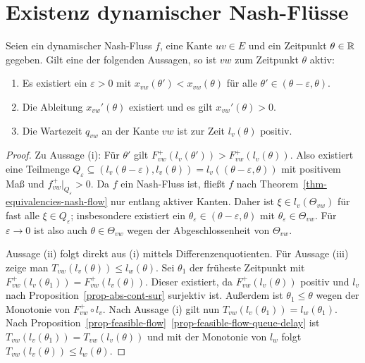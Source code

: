 \section{Existenz dynamischer Nash-Flüsse}

\begin{lemma}\label{lemma-nash-flow-waiting-queue-implies-active-edge}
	Seien ein dynamischer Nash-Fluss $f$, eine Kante $uv\in E$ und ein Zeitpunkt $\theta\in\mathbb{R}$ gegeben.
	Gilt eine der folgenden Aussagen, so ist $vw$ zum Zeitpunkt $\theta$ aktiv:
	\begin{enumerate}[label=(\roman*)]
		\item Es existiert ein $\varepsilon>0$ mit $x_{vw}(\theta')<x_{vw}(\theta)$ für alle $\theta'\in(\theta-\varepsilon, \theta)$.
		\item Die Ableitung $x_{vw}'(\theta)$ existiert und es gilt $x_{vw}'(\theta)> 0$.
		\item Die Wartezeit $q_{vw}$ an der Kante $vw$ ist zur Zeit $l_v(\theta)$ positiv.
	\end{enumerate}
\end{lemma}
\begin{proof}
	Zu Aussage (i): Für $\theta'$ gilt $F_{vw}^+(l_v(\theta')) > F_{vw}^+(l_v(\theta))$.
	Also existiert eine Teilmenge $Q_\varepsilon \subseteq (l_v(\theta-\varepsilon), l_v(\theta))=l_v((\theta - \varepsilon, \theta))$ mit positivem Maß und $f_{vw}^+\big|_{Q_\varepsilon} > 0$.
	Da $f$ ein Nash-Fluss ist, fließt $f$ nach Theorem~\ref{thm-equivalencies-nash-flow} nur entlang aktiver Kanten.
	Daher ist $\xi\in l_v(\Theta_{vw})$ für fast alle $\xi\in Q_\varepsilon$; insbesondere existiert ein $\theta_\varepsilon\in (\theta-\varepsilon, \theta)$ mit $\theta_\varepsilon\in\Theta_{vw}$.
	Für $\varepsilon\rightarrow0$ ist also auch $\theta\in\Theta_{vw}$ wegen der Abgeschlossenheit von $\Theta_{vw}$.
	
	Aussage (ii) folgt direkt aus (i) mittels Differenzenquotienten.
	Für Aussage (iii) zeige man $T_{vw}(l_v(\theta)) \leq l_w(\theta)$.
	Sei $\theta_1$ der früheste Zeitpunkt mit $F_{vw}^+(l_v(\theta_1)) = F_{vw}^+(l_v(\theta))$.
	Dieser existiert, da $F_{vw}^+(l_v(\theta))$ positiv und $l_v$ nach Proposition~\ref{prop-abs-cont-sur} surjektiv ist.
	Außerdem ist $\theta_1 \leq \theta$ wegen der Monotonie von $F_{vw}^+ \circ l_v$.
	Nach Aussage (i) gilt nun $T_{vw}(l_v(\theta_1)) = l_w(\theta_1)$.
	Nach Proposition~\ref{prop-feasible-flow}~\ref{prop-feasible-flow-queue-delay} ist $T_{vw}(l_v(\theta_1)) = T_{vw}(l_v(\theta))$ und mit der Monotonie von $l_w$ folgt $T_{vw}(l_v(\theta))\leq l_w(\theta)$.
\end{proof}

